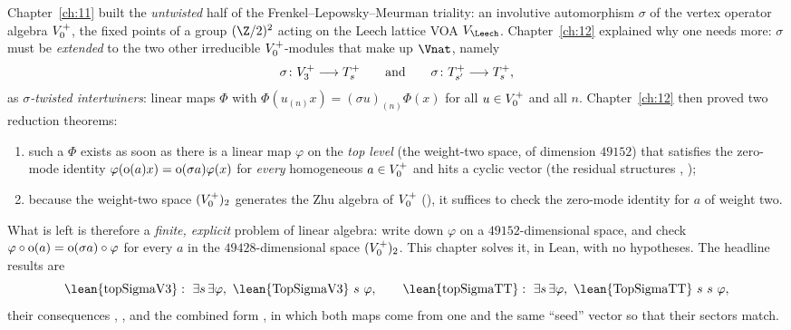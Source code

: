 Chapter~\ref{ch:11} built the \emph{untwisted} half of the Frenkel--Lepowsky--Meurman triality: an
involutive automorphism $\sigma$ of the vertex operator algebra $V_0^{+}$, the fixed points of a
group $(\Z/2)^2$ acting on the Leech lattice VOA $V_\Leech$. Chapter~\ref{ch:12} explained why one
needs more: $\sigma$ must be \emph{extended} to the two other irreducible $V_0^{+}$-modules
that make up $\Vnat$, namely
\begin{equation*}
  \sigma\colon V_3^{+} \longrightarrow T_{s}^{+} \qquad\text{and}\qquad
  \sigma\colon T_{s'}^{+}\longrightarrow T_{s}^{+},
\end{equation*}
as \emph{$\sigma$-twisted intertwiners}: linear maps $\Phi$ with $\Phi(u_{(n)}x)=(\sigma u)_{(n)}\Phi(x)$
for all $u\in V_0^{+}$ and all $n$. Chapter~\ref{ch:12} then proved two reduction theorems:
\begin{enumerate}[label=(\roman*)]
\item such a $\Phi$ exists as soon as there is a linear map $\varphi$ on the \emph{top level} (the
  weight-two space, of dimension $49152$) that satisfies the zero-mode identity
  $\varphi(\operatorname{o}(a)x)=\operatorname{o}(\sigma a)\varphi(x)$ for \emph{every} homogeneous $a\in V_0^{+}$
  and hits a cyclic vector (the residual structures , );
\item because the weight-two space $(V_0^{+})_2$ generates the Zhu algebra of $V_0^{+}$
  (), it suffices to check the zero-mode identity for $a$ of weight two.
\end{enumerate}
What is left is therefore a \emph{finite, explicit} problem of linear algebra: write down $\varphi$ on a
$49152$-dimensional space, and check $\varphi\circ\operatorname{o}(a)=\operatorname{o}(\sigma a)\circ\varphi$ for every
$a$ in the $49428$-dimensional space $(V_0^{+})_2$. This chapter solves it, in Lean, with no
hypotheses. The headline results are
\begin{equation*}
  \text{\lean{topSigmaV3}}:\ \exists s\,\exists\varphi,\ \text{\lean{TopSigmaV3} } s\ \varphi,
  \qquad
  \text{\lean{topSigmaTT}}:\ \exists s\,\exists\varphi,\ \text{\lean{TopSigmaTT} } s\ s\ \varphi,
\end{equation*}
their consequences , , and the combined form
, in which both maps come from one and the same ``seed'' vector so that their
sectors match.

